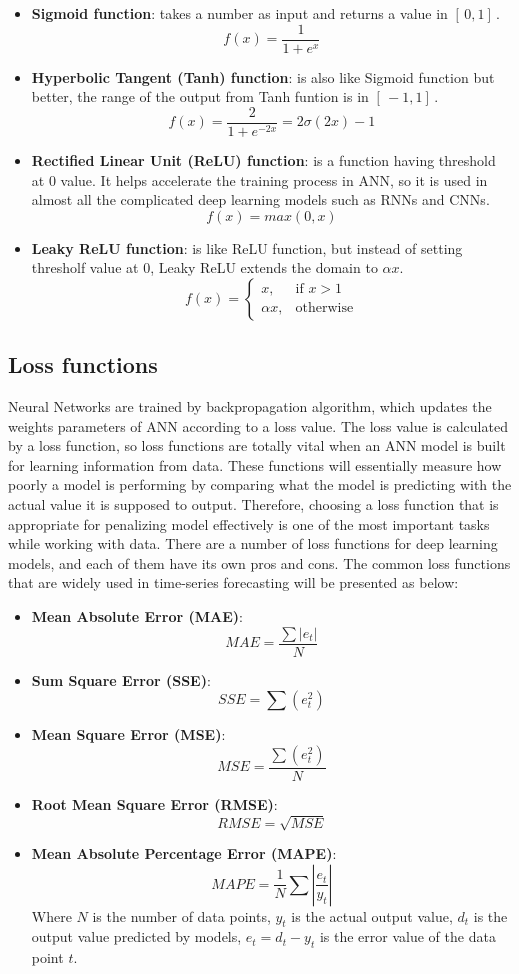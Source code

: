 \documentclass[a4paper,13pt,2p]{report}
\begin{document}
\begin{itemize}
\item \textbf{Sigmoid function}: takes a number as input and returns a value in $	[ \,0,1] \,$.
	$$f(x) = \frac{1}{1+e^x}$$
\item \textbf{Hyperbolic Tangent (Tanh) function}: is also like Sigmoid function but better, the range of the output from Tanh funtion is in $	[ \,-1,1] \,$.
 $$f(x) = \frac{2}{1+e^{-2x}} = 2\sigma(2x)-1$$
\item \textbf{Rectified Linear Unit (ReLU) function}: is a function having threshold at $0$ value. It helps accelerate the training process in ANN, so it is used in almost all the complicated deep learning models such as RNNs and CNNs.
$$f(x) = max(0, x)$$
\item \textbf{Leaky ReLU function}: is like ReLU function, but instead of setting thresholf value at $0$, Leaky ReLU extends the domain to $\alpha x$.
\[
    f(x)= 
\begin{cases}
    x,& \text{if } x > 1\\
    \alpha x, & \text{otherwise}
\end{cases}
\]
\end{itemize}
	
\subsection{Loss functions}
\label{ann_loss_func}
Neural Networks are trained by backpropagation algorithm, which updates the weights parameters of ANN according to a loss value. The loss value is calculated by a loss function, so loss functions are totally vital when an ANN model is built for learning information from data. These functions will essentially measure how poorly a model is performing by comparing what the model is predicting with the actual value it is supposed to output. Therefore, choosing a loss function that is appropriate for penalizing model effectively is one of the most important tasks while working with data. There are a number of loss functions for deep learning models, and each of them have its own pros and cons. The common loss functions that are widely used in time-series forecasting will be presented as below:
\begin{itemize}
\item  \textbf{Mean Absolute Error (MAE)}: 
$$MAE = \frac{\sum|e_t|}{N}$$
\item  \textbf{Sum Square Error (SSE)}: $$SSE = \sum(e_t^2)$$
\item  \textbf{Mean Square Error (MSE)}: $$MSE = \frac{\sum(e_t^2)}{N}$$
\item  \textbf{Root Mean Square Error (RMSE)}: $$RMSE = \sqrt{MSE}$$
\item  \textbf{Mean Absolute Percentage Error (MAPE)}: $$MAPE = \frac{1}{N}\sum|\frac{e_t}{y_t}|$$
Where $N$ is the number of data points, $y_t$ is the actual output value, $d_t$ is the output value predicted by models, $e_t = d_t - y_t$ is the error value of the data point $t$.
\end{itemize}
	 
\end{document}
